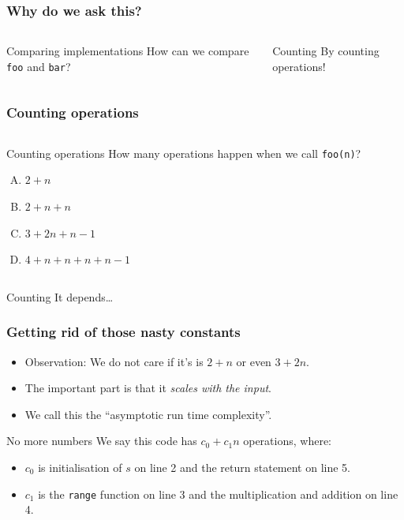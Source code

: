 \begin{frame}
	\frametitle{Why do we ask this?}

	\begin{columns}
			
			
		\pause
		\begin{block}{Comparing implementations}
			How can we compare \texttt{foo} and \texttt{bar}?
		\end{block}
		\pause
		\begin{block}{Counting}
			By counting operations!
		\end{block}
	\end{columns}
\end{frame}

\begin{frame}
	\frametitle{Counting operations}
	\begin{columns}
		\column{0.455\textwidth}
			
		\column{0.455\textwidth}
		\pause
		\begin{block}{Counting operations}
			How many operations happen when we call \texttt{foo(n)}?
			\begin{enumerate}[A.]
				\item $2 + n$
				\item $2 + n + n$
				\item $3 + 2n + n-1$
				\item $4 + n + n + n + n-1$
			\end{enumerate}
		\end{block}
	\end{columns}
	\pause
	\begin{block}{Counting}
		It depends\dots
	\end{block}
\end{frame}

\begin{frame}
	\frametitle{Getting rid of those nasty constants}

	\begin{itemize}
		\item Observation: We do not care if it's is $2+n$ or even $3+2n$.
		\item The important part is that it \textit{scales with the input}.
			\pause
		\item We call this the ``asymptotic run time complexity''.
	\end{itemize}
	\pause
	

	\begin{block}{No more numbers}
		We say this code has $c_0 + c_1n$ operations, where:
		\begin{itemize}
			\item $c_0$ is initialisation of $s$ on line 2 and the return statement on line 5.
			\item $c_1$ is the \texttt{range} function on line 3 and the multiplication and addition on line 4.
		\end{itemize}
	\end{block}
\end{frame}

